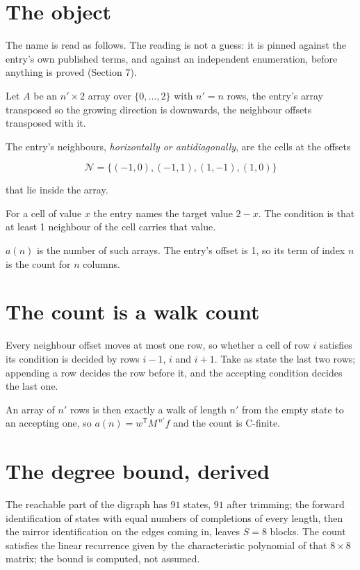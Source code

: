 \documentclass[11pt]{article}
\theoremstyle{definition}
\begin{document}
\section{The object}

The name is read as follows. The reading is not a guess: it is pinned against the entry's own published terms, and against an independent enumeration, before anything is proved (Section 7).

Let $A$ be an $n' \times 2$ array over $\{0,\dots,2\}$ with $n' = n$ rows, the entry's array transposed so the growing direction is downwards, the neighbour offsets transposed with it.

The entry's neighbours, {\itshape horizontally or antidiagonally}, are the cells at the offsets

\[\mathcal{N} = \{(-1,0), (-1,1), (1,-1), (1,0)\}\]

that lie inside the array.

For a cell of value $x$ the entry names the target value $2 - x$. The condition is that at least 1 neighbour of the cell carries that value.

$a(n)$ is the number of such arrays. The entry's offset is 1, so its term of index $n$ is the count for $n$ columns.

\section{The count is a walk count}

Every neighbour offset moves at most one row, so whether a cell of row $i$ satisfies its condition is decided by rows $i-1$, $i$ and $i+1$. Take as state the last two rows; appending a row decides the row before it, and the accepting condition decides the last one.

An array of $n'$ rows is then exactly a walk of length $n'$ from the empty state to an accepting one, so $a(n) = w^{\mathsf T}M^{\,n'}f$ and the count is C-finite.

\section{The degree bound, derived}

The reachable part of the digraph has $91$ states, $91$ after trimming; the forward identification of states with equal numbers of completions of every length, then the mirror identification on the edges coming in, leaves $S = 8$ blocks. The count satisfies the linear recurrence given by the characteristic polynomial of that $8\times8$ matrix; the bound is computed, not assumed.
\end{document}
